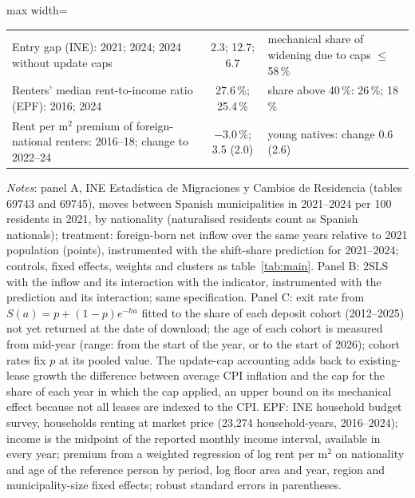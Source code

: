 \begin{table}[!htbp]
\begin{adjustbox}{max width=\linewidth}
\begin{tabular}{lccccc}
Entry gap (INE): 2021; 2024; 2024 without update caps & \multicolumn{2}{c}{2.3; 12.7; 6.7} & \multicolumn{3}{l}{mechanical share of widening due to caps $\le$ 58\,\%}\\
Renters' median rent-to-income ratio (EPF): 2016; 2024 & \multicolumn{2}{c}{27.6\,\%; 25.4\,\%} & \multicolumn{3}{l}{share above 40\,\%: 26\,\%; 18\,\%}\\
Rent per m$^2$ premium of foreign-national renters: 2016--18; change to 2022--24 & \multicolumn{2}{c}{$-$3.0\,\%; 3.5 (2.0)} & \multicolumn{3}{l}{young natives: change 0.6 (2.6)}\\
\bottomrule\end{tabular}\end{adjustbox}
\begin{minipage}{0.97\linewidth}\footnotesize\vspace{4pt}
\textit{Notes}: panel A, INE Estadística de Migraciones y Cambios de Residencia (tables 69743 and 69745), moves between Spanish municipalities in 2021--2024 per 100 residents in 2021, by nationality (naturalised residents count as Spanish nationals); treatment: foreign-born net inflow over the same years relative to 2021 population (points), instrumented with the shift-share prediction for 2021--2024; controls, fixed effects, weights and clusters as table~\ref{tab:main}. Panel B: 2SLS with the inflow and its interaction with the indicator, instrumented with the prediction and its interaction; same specification. Panel C: exit rate from $S(a)=p+(1-p)e^{-ha}$ fitted to the share of each deposit cohort (2012--2025) not yet returned at the date of download; the age of each cohort is measured from mid-year (range: from the start of the year, or to the start of 2026); cohort rates fix $p$ at its pooled value. The update-cap accounting adds back to existing-lease growth the difference between average CPI inflation and the cap for the share of each year in which the cap applied, an upper bound on its mechanical effect because not all leases are indexed to the CPI. EPF: INE household budget survey, households renting at market price (23,274 household-years, 2016--2024); income is the midpoint of the reported monthly income interval, available in every year; premium from a weighted regression of log rent per m$^2$ on nationality and age of the reference person by period, log floor area and year, region and municipality-size fixed effects; robust standard errors in parentheses.
\end{minipage}\end{table}